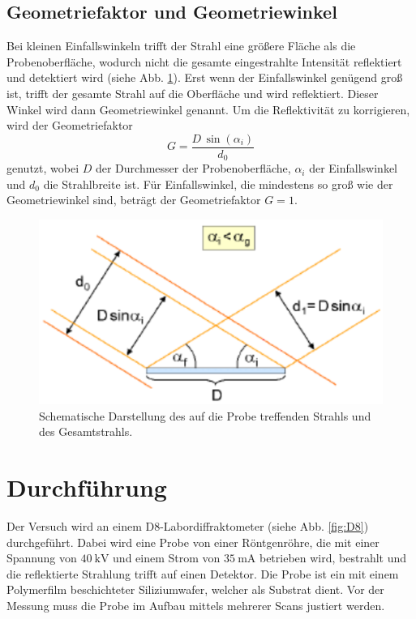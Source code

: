 \subsection{Geometriefaktor und Geometriewinkel}
Bei kleinen Einfallswinkeln trifft der Strahl eine größere Fläche als die Probenoberfläche, wodurch nicht die gesamte eingestrahlte Intensität reflektiert und detektiert wird (siehe Abb. \ref{fig:Geometriewinkel}).
Erst wenn der Einfallswinkel genügend groß ist, trifft der gesamte Strahl auf die Oberfläche und wird reflektiert. Dieser Winkel wird dann Geometriewinkel genannt.
Um die Reflektivität zu korrigieren, wird der Geometriefaktor
\begin{equation}
    G = \frac{D \, \sin(\alpha_i)}{d_0}
    \label{eq:Geometriefaktor}
\end{equation}
genutzt, wobei $D$ der Durchmesser der Probenoberfläche, $\alpha_i$ der Einfallswinkel und $d_0$ die Strahlbreite ist.
Für Einfallswinkel, die mindestens so groß wie der Geometriewinkel sind, beträgt der Geometriefaktor $G = 1$. 

\begin{figure}
    \centering
    \includegraphics[width=0.7\linewidth]{./figures/Geometriewinkel.png}
    \caption{Schematische Darstellung des auf die Probe treffenden Strahls und des Gesamtstrahls. \cite{V44old}}
    \label{fig:Geometriewinkel}
\end{figure}



\section{Durchführung}
\label{sec:durchfuehrung}

Der Versuch wird an einem D8-Labordiffraktometer (siehe Abb. \ref{fig:D8}) durchgeführt.
Dabei wird eine Probe von einer Röntgenröhre, die mit einer Spannung von $\SI{40}{\kilo\volt}$ und einem Strom von $\SI{35}{\milli\ampere}$ betrieben wird, bestrahlt und die reflektierte Strahlung trifft auf einen Detektor. %
Die Probe ist ein mit einem Polymerfilm beschichteter Siliziumwafer, welcher als Substrat dient.
Vor der Messung muss die Probe im Aufbau mittels mehrerer Scans justiert werden.

